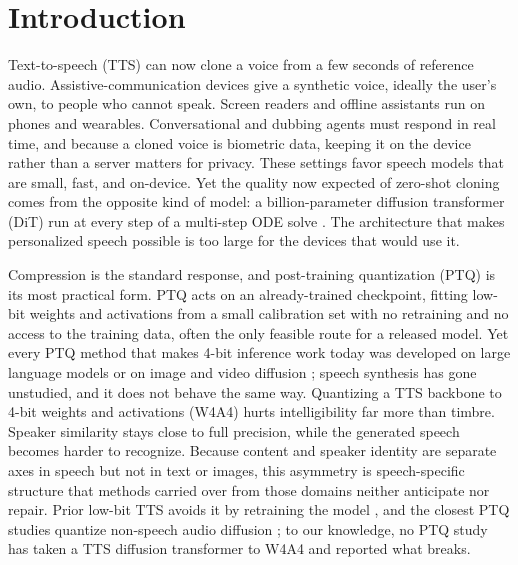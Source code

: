 \section{Introduction}
Text-to-speech (TTS) can now clone a voice from a few seconds of reference audio.  Assistive-communication devices give a synthetic voice, ideally the user's own, to people who cannot speak. Screen readers and offline assistants run on phones and wearables. Conversational and dubbing agents must respond in real time, and because a cloned voice is biometric data, keeping it on the device rather than a server matters for privacy. These settings favor speech models that are small, fast, and on-device. Yet the quality now expected of zero-shot cloning comes from the opposite kind of model: a billion-parameter diffusion transformer (DiT) \citep{peebles2023dit} run at every step of a multi-step ODE solve \citep{anastassiou2024seedtts,chen2024f5tts,du2024cosyvoice2,xin2026longcat}. The architecture that makes personalized speech possible is too large for the devices that would use it.
 
Compression is the standard response, and post-training quantization (PTQ) is its most practical form. PTQ acts on an already-trained checkpoint, fitting low-bit weights and activations from a small calibration set with no retraining and no access to the training data, often the only feasible route for a released model. Yet every PTQ method that makes 4-bit inference work today was developed on large language models \citep{xiao2023smoothquant,frantar2023gptq,ashkboos2024quarot,sun2025flatquant} or on image and video diffusion \citep{li2023qdiffusion,zhao2025viditq,li2025svdquant}; speech synthesis has gone unstudied, and it does not behave the same way. Quantizing a TTS backbone to 4-bit weights and activations (W4A4) hurts intelligibility far more than timbre. Speaker similarity stays close to full precision, while the generated speech becomes harder to recognize. Because content and speaker identity are separate axes in speech but not in text or images, this asymmetry is speech-specific structure that methods carried over from those domains neither anticipate nor repair. Prior low-bit TTS avoids it by retraining the model \citep{kawamura2025bittts}, and the closest PTQ studies quantize non-speech audio diffusion \citep{khandelwal2025ptqaudio,vora2025ptq4adm}; to our knowledge, no PTQ study has taken a TTS diffusion transformer to W4A4 and reported what breaks.
 
